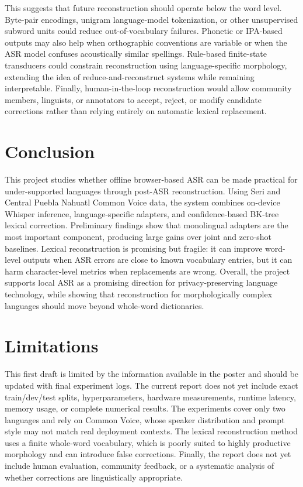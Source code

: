 \documentclass[11pt]{article}
\begin{document}
This suggests that future reconstruction should operate below the word level. Byte-pair encodings, unigram language-model tokenization, or other unsupervised subword units could reduce out-of-vocabulary failures. Phonetic or IPA-based outputs may also help when orthographic conventions are variable or when the ASR model confuses acoustically similar spellings. Rule-based finite-state transducers could constrain reconstruction using language-specific morphology, extending the idea of reduce-and-reconstruct systems while remaining interpretable. Finally, human-in-the-loop reconstruction would allow community members, linguists, or annotators to accept, reject, or modify candidate corrections rather than relying entirely on automatic lexical replacement.

\section{Conclusion}

This project studies whether offline browser-based ASR can be made practical for under-supported languages through post-ASR reconstruction. Using Seri and Central Puebla Nahuatl Common Voice data, the system combines on-device Whisper inference, language-specific adapters, and confidence-based BK-tree lexical correction. Preliminary findings show that monolingual adapters are the most important component, producing large gains over joint and zero-shot baselines. Lexical reconstruction is promising but fragile: it can improve word-level outputs when ASR errors are close to known vocabulary entries, but it can harm character-level metrics when replacements are wrong. Overall, the project supports local ASR as a promising direction for privacy-preserving language technology, while showing that reconstruction for morphologically complex languages should move beyond whole-word dictionaries.

\section{Limitations}

This first draft is limited by the information available in the poster and should be updated with final experiment logs. The current report does not yet include exact train/dev/test splits, hyperparameters, hardware measurements, runtime latency, memory usage, or complete numerical results. The experiments cover only two languages and rely on Common Voice, whose speaker distribution and prompt style may not match real deployment contexts. The lexical reconstruction method uses a finite whole-word vocabulary, which is poorly suited to highly productive morphology and can introduce false corrections. Finally, the report does not yet include human evaluation, community feedback, or a systematic analysis of whether corrections are linguistically appropriate.
\end{document}
